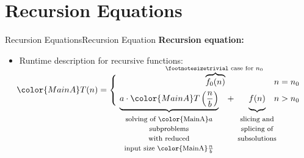 \section{Recursion Equations}

\begin{frame}{Recursion Equations}{Recursion Equation}
  \textbf{Recursion equation:}
  \begin{itemize}
    \item
      Runtime description for recursive functions:
  \end{itemize}
  \vspace{2em}
  \begin{displaymath}
    {\color{MainA}T(n)} =
    \begin{cases}
      \hfill
      \smash{
        \overbrace{f_0(n)}^\text{%
          \footnotesize%
          trivial case for $n_0$
        }
      }
      \vphantom{f_0(n)} & n = n_0\\[0.5em]
      \smash{
        \underbrace{
          a \cdot {\color{MainA}T\left(\frac{n}{b}\right)}
        }_\text{
          \footnotesize%
          \begin{tabular}{c}
            \text{solving of {\color{MainA}$a$}}\\
            \text{subproblems}\\
            \text{with reduced}\\
            \text{input size {\color{MainA}$\frac{n}{b}$}}
          \end{tabular}
        }
      } \hspace{0.5em} + \hspace{1.5em}
      \smash{
        \underbrace{
          f(n)
          \vphantom{\left(\frac{n}{b}\right)}
        }_\text{
          \makebox[0pt][c]{
            \footnotesize%
            \begin{tabular}{c}
              slicing and\\
              splicing of\\
              subsolutions
            \end{tabular}
          }
        }
      }
      \vphantom{\left(\frac{n}{b}\right)}
      &n > n_0
    \end{cases}
  \end{displaymath}
  \vspace{4em}
\end{frame}


